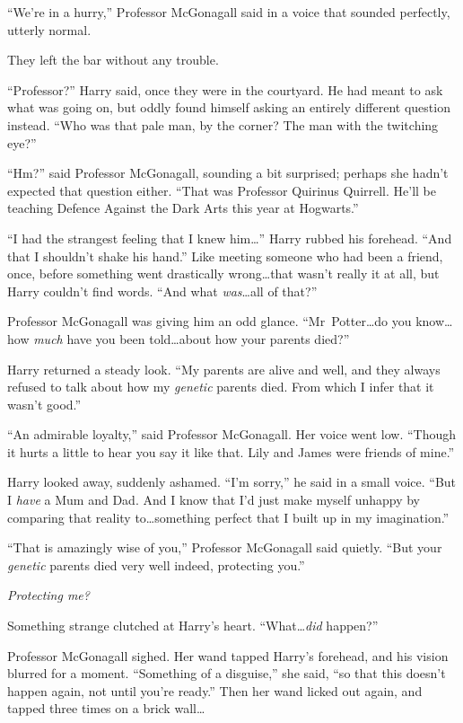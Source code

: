 “We’re in a hurry,” Professor McGonagall said in a voice that sounded perfectly, utterly normal.

They left the bar without any trouble.

“Professor?” Harry said, once they were in the courtyard. He had meant to ask what was going on, but oddly found himself asking an entirely different question instead.
“Who was that pale man, by the corner? The man with the twitching eye?”

“Hm?” said Professor McGonagall, sounding a bit surprised; perhaps she hadn’t expected that question either.
“That was Professor Quirinus Quirrell. He’ll be teaching Defence Against the Dark Arts this year at Hogwarts.”

“I had the strangest feeling that I knew him…” Harry rubbed his forehead.
“And that I shouldn’t shake his hand.” Like meeting someone who had been a friend, once, before something went drastically wrong…that wasn’t really it at all, but Harry couldn’t find words.
“And what \emph{was}…all of that?”

Professor McGonagall was giving him an odd glance.
“Mr~Potter…do you know…how \emph{much} have you been told…about how your parents died?”

Harry returned a steady look.
“My parents are alive and well, and they always refused to talk about how my \emph{genetic} parents died. From which I infer that it wasn’t good.”

“An admirable loyalty,” said Professor McGonagall. Her voice went low.
“Though it hurts a little to hear you say it like that. Lily and James were friends of mine.”

Harry looked away, suddenly ashamed.
“I’m sorry,” he said in a small voice.
“But I \emph{have} a Mum and Dad. And I know that I’d just make myself unhappy by comparing that reality to…something perfect that I built up in my imagination.”

“That is amazingly wise of you,” Professor McGonagall said quietly.
“But your \emph{genetic} parents died very well indeed, protecting you.”

\emph{Protecting me?}

Something strange clutched at Harry’s heart.
“What…\emph{did} happen?”

Professor McGonagall sighed. Her wand tapped Harry’s forehead, and his vision blurred for a moment.
“Something of a disguise,” she said, “so that this doesn’t happen again, not until you’re ready.” Then her wand licked out again, and tapped three times on a brick wall…

